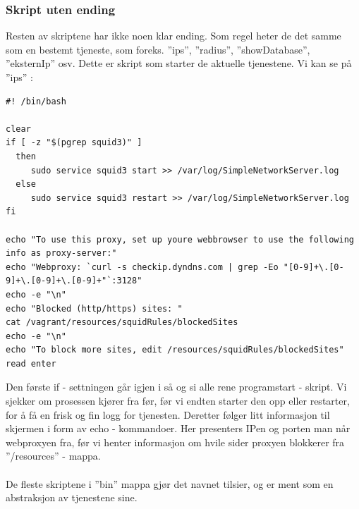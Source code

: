 \documentclass{article}
\begin{document}
\subsubsection{Skript uten ending}
Resten av skriptene har ikke noen klar ending. Som regel heter de det samme som en bestemt tjeneste, som foreks. ''ips'', ''radius'', ''showDatabase'', ''eksternIp'' osv. Dette er skript som starter de aktuelle tjenestene. Vi kan se på ''ips'' :
\newpage
\begin{lstlisting}
#! /bin/bash

clear
if [ -z "$(pgrep squid3)" ]
  then
     sudo service squid3 start >> /var/log/SimpleNetworkServer.log
  else
     sudo service squid3 restart >> /var/log/SimpleNetworkServer.log
fi

echo "To use this proxy, set up youre webbrowser to use the following info as proxy-server:"
echo "Webproxy: `curl -s checkip.dyndns.com | grep -Eo "[0-9]+\.[0-9]+\.[0-9]+\.[0-9]+"`:3128"
echo -e "\n"
echo "Blocked (http/https) sites: "
cat /vagrant/resources/squidRules/blockedSites
echo -e "\n"
echo "To block more sites, edit /resources/squidRules/blockedSites"
read enter
\end{lstlisting}
Den første if - settningen går igjen i så og si alle rene programstart - skript. Vi sjekker om prosessen kjører fra før, før vi endten starter den opp eller restarter, for å få en frisk og fin logg for tjenesten. Deretter følger litt informasjon til skjermen i form av echo - kommandoer. Her presenters IPen og porten man når webproxyen fra, før vi henter informasjon om hvile sider proxyen blokkerer fra ''/resources'' - mappa.
\\ \\
De fleste skriptene i ''bin'' mappa gjør det navnet tilsier, og er ment som en abstraksjon av tjenestene sine.
\end{document}
